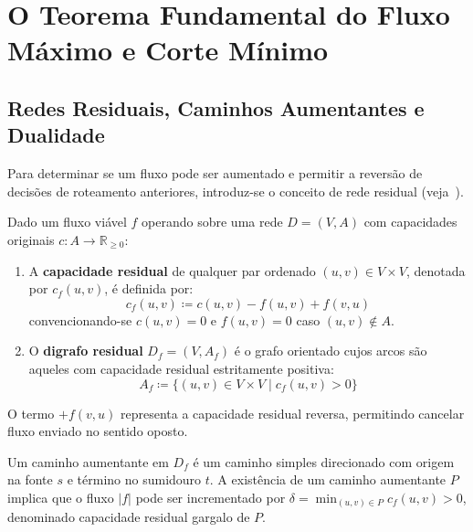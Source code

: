 \chapter{O Teorema Fundamental do Fluxo Máximo e Corte Mínimo}\label{sec:mfmc_capitulo}

\section{Redes Residuais, Caminhos Aumentantes e Dualidade}

Para determinar se um fluxo pode ser aumentado e permitir a reversão de decisões de roteamento anteriores, introduz-se o conceito de rede residual (veja~\cite{ahuja1993network, ford1956maximal}).

\begin{definicao}
Dado um fluxo viável $f$ operando sobre uma rede $D = (V, A)$ com capacidades originais $c: A \to \mathbb{R}_{\ge 0}$:
\begin{enumerate}
    \item A \textbf{capacidade residual} de qualquer par ordenado $(u,v) \in V \times V$, denotada por $c_f(u,v)$, é definida por:
    \begin{equation}
        c_f(u,v) \coloneqq c(u,v) - f(u,v) + f(v,u)
    \end{equation}
    convencionando-se $c(u,v) = 0$ e $f(u,v) = 0$ caso $(u,v) \notin A$.
    \item O \textbf{digrafo residual} $D_f = (V, A_f)$ é o grafo orientado cujos arcos são aqueles com capacidade residual estritamente positiva:
    \begin{equation}
        A_f \coloneqq \{ (u,v) \in V \times V \mid c_f(u,v) > 0 \}
    \end{equation}
\end{enumerate}
O termo $+ f(v,u)$ representa a capacidade residual reversa, permitindo cancelar fluxo enviado no sentido oposto.
\end{definicao}

Um caminho aumentante em $D_f$ é um caminho simples direcionado com origem na fonte $s$ e término no sumidouro $t$. A existência de um caminho aumentante $P$ implica que o fluxo $|f|$ pode ser incrementado por $\delta = \min_{(u,v) \in P} c_f(u,v) > 0$, denominado capacidade residual gargalo de $P$.


